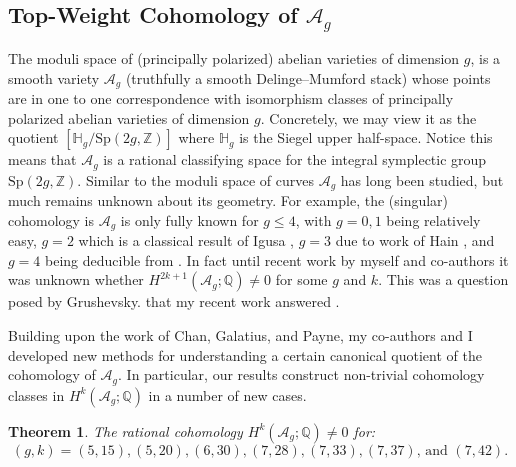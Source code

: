 \documentclass[11pt,reqno]{amsart}
\newtheorem{theorem}[lemma]{Theorem}
\theoremstyle{remark}
\newcommand{\HH}{\mathbb{H}}
\newcommand{\QQ}{\mathbb{Q}}
\newcommand{\ZZ}{\mathbb{Z}}
\newcommand{\cA}{\mathcal{A}}
\begin{document}
\subsection{Top-Weight Cohomology of $\mathcal{A}_{g}$}\label{subsec:prior:cohomology-of-ag}

The moduli space of (principally polarized) abelian varieties of dimension $g$, is a smooth variety $\cA_{g}$ (truthfully a smooth Delinge--Mumford stack) whose points are in one to one correspondence with isomorphism classes of principally polarized abelian varieties of dimension $g$. Concretely, we may view it as the quotient $[\mathbb{H}_g/\mathrm{Sp}(2g, \ZZ)]$ where $\HH_{g}$ is the Siegel upper half-space. Notice this means that $\cA_{g}$  is a rational classifying space for the integral symplectic group $\mathrm{Sp}(2g,\ZZ)$. Similar to the moduli space of curves $\cA_{g}$ has long been studied, but much remains unknown about its geometry. For example, the (singular) cohomology is $\cA_{g}$ is only fully known for $g\leq 4$, with $g=0,1$ being relatively easy, $g=2$ which is a classical result of Igusa \cite{igusa62},  $g=3$ due to work of Hain \cite{hain02}, and $g=4$ being deducible from \cite{HT12,HT18}. In fact until recent work by myself and co-authors it was unknown whether $H^{2k+1}(\cA_{g};\QQ)\neq0$ for some $g$ and $k$. This was a question posed by Grushevsky. that my recent work answered \cite{grushevsky09}. 

Building upon the work of Chan, Galatius, and Payne, my co-authors and I developed new methods for understanding a certain canonical quotient of the cohomology of $\cA_{g}$. In particular, our results construct non-trivial cohomology classes in $H^{k}(\cA_{g}; \QQ)$ in a number of new cases. 

\begin{theorem}\cite[Theorem A]{BBCMMW24}\label{thm:Ag}
The rational cohomology $H^{k}\left(\cA_{g};\QQ\right)\neq0$ for:
\[
\text{$(g,k)=(5,15),(5,20),(6,30),(7,28),(7,33),(7,37)$, and $(7,42)$}.
\]
\end{theorem}
\end{document}
